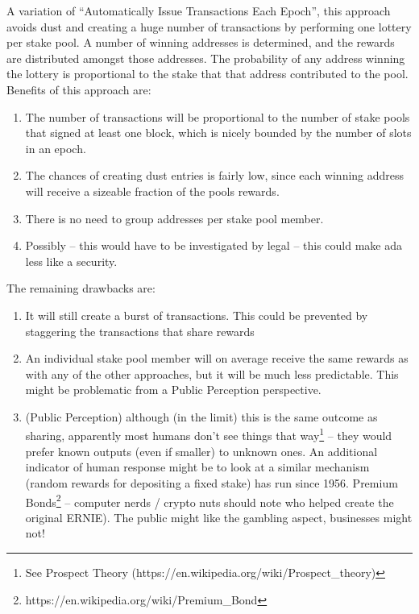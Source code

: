 \documentclass[11pt,a4paper]{article}
\begin{document}
A variation of ``Automatically Issue Transactions Each Epoch'', this
approach avoids dust and creating a huge number of transactions by
performing one lottery per stake pool. A number of winning addresses is
determined, and the rewards are distributed amongst those addresses. The
probability of any address winning the lottery is proportional to the
stake that that address contributed to the pool. Benefits of this
approach are:

\begin{enumerate}
\item
  The number of transactions will be proportional to the number of stake
  pools that signed at least one block, which is nicely bounded by the
  number of slots in an epoch.
\item
  The chances of creating dust entries is fairly low, since each winning
  address will receive a sizeable fraction of the pools rewards.
\item
  There is no need to group addresses per stake pool member.
\item
  Possibly -- this would have to be investigated by legal -- this could
  make ada less like a security.
\end{enumerate}

The remaining drawbacks are:

\begin{enumerate}
\item
  It will still create a burst of transactions. This could be prevented
  by staggering the transactions that share rewards
\item
  An individual stake pool member will on average receive the same
  rewards as with any of the other approaches, but it will be much less
  predictable. This might be problematic from a Public Perception
  perspective.
\item
  (Public Perception) although (in the limit) this is the same outcome
  as sharing, apparently most humans don't see things that way\footnote{See
  Prospect Theory (https://en.wikipedia.org/wiki/Prospect\_theory)} --
  they would prefer known outputs (even if smaller) to unknown ones.
  An additional indicator of human response might be to look at a
  similar mechanism (random rewards for depositing a fixed stake) has
  run since 1956. Premium
  Bonds\footnote{https://en.wikipedia.org/wiki/Premium\_Bond} --
  computer nerds /
  crypto nuts should note who helped create the original ERNIE). The
  public might like the gambling aspect, businesses might not!
\end{enumerate}
\end{document}
